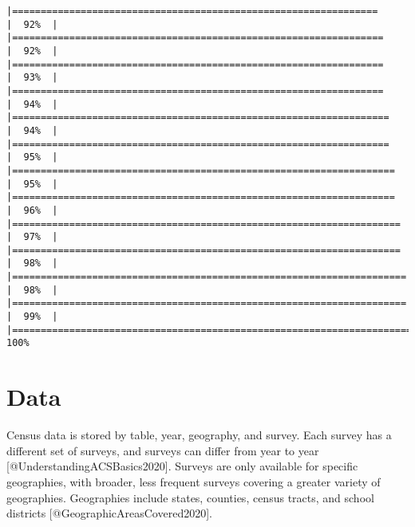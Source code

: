 \documentclass[
]{article}
\begin{document}
\begin{verbatim}
|================================================================      |  92%  |                                                                              |=================================================================     |  92%  |                                                                              |=================================================================     |  93%  |                                                                              |=================================================================     |  94%  |                                                                              |==================================================================    |  94%  |                                                                              |==================================================================    |  95%  |                                                                              |===================================================================   |  95%  |                                                                              |===================================================================   |  96%  |                                                                              |====================================================================  |  97%  |                                                                              |====================================================================  |  98%  |                                                                              |===================================================================== |  98%  |                                                                              |===================================================================== |  99%  |                                                                              |======================================================================| 100%
\end{verbatim}

\hypertarget{data}{%
\section{Data}\label{data}}

Census data is stored by table, year, geography, and survey. Each survey
has a different set of surveys, and surveys can differ from year to year
{[}@UnderstandingACSBasics2020{]}. Surveys are only available for
specific geographies, with broader, less frequent surveys covering a
greater variety of geographies. Geographies include states, counties,
census tracts, and school districts {[}@GeographicAreasCovered2020{]}.
\end{document}
